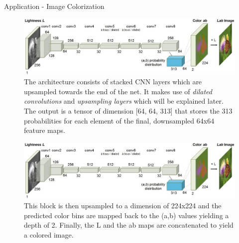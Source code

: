 \begin{vbframe}{Application - Image Colorization}
\begin{figure}
            \end{figure}
            \framebreak
            \begin{figure}
            \centering
            \includegraphics[width=11.5cm]{figure/color_architecture.png}
            \caption{The architecture consists of stacked CNN layers which are upsampled towards the end of the net. It makes use of \textit{dilated convolutions} and \textit{upsampling layers} which will be explained later. The output is a tensor of dimension [64, 64, 313] that stores the 313 probabilities for each element of the final, downsampled 64x64 feature maps.} 
            \end{figure}
            \framebreak
            \begin{figure}
            \centering
            \includegraphics[width=11.5cm]{figure/color_architecture.png}
            \caption{This block is then upsampled to a dimension of 224x224 and the predicted color bins are mapped back to the (a,b) values yielding a depth of 2. Finally, the L and the ab maps are concatenated to yield a colored image.} 
            \end{figure}
            \end{vbframe}
